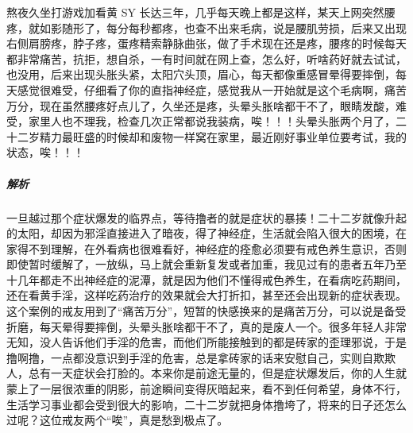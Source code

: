 \begin{case}[神经衰弱]
    熬夜久坐打游戏加看黄 SY 长达三年，几乎每天晚上都是这样，某天上网突然腰疼，就如影随形了，每分每秒都疼，也查不出来毛病，说是腰肌劳损，后来又出现右侧肩膀疼，脖子疼，蛋疼精索静脉曲张，做了手术现在还是疼，腰疼的时候每天都非常痛苦，抗拒，想自杀，一有时间就在网上查，怎么好，听啥药好就去试试，也没用，后来出现头胀头紧，太阳穴头顶，眉心，每天都像重感冒晕得要摔倒，每天感觉很难受，仔细看了你的直指神经症，感觉我从一开始就是这个毛病啊，痛苦万分，现在虽然腰疼好点儿了，久坐还是疼，头晕头胀啥都干不了，眼睛发酸，难受，家里人也不理我，检查几次正常都说我装病，唉！！！头晕头胀两个月了，二十二岁精力最旺盛的时候却和废物一样窝在家里，最近刚好事业单位要考试，我的状态，唉！！！
    \subparagraph{解析} 一旦越过那个症状爆发的临界点，等待撸者的就是症状的暴揍！二十二岁就像升起的太阳，却因为邪淫直接进入了暗夜，得了神经症，生活就会陷入很大的困境，在家得不到理解，在外看病也很难看好，神经症的痊愈必须要有戒色养生意识，否则即使暂时缓解了，一放纵，马上就会重新复发或者加重，我见过有的患者五年乃至十几年都走不出神经症的泥潭，就是因为他们不懂得戒色养生，在看病吃药期间，还在看黄手淫，这样吃药治疗的效果就会大打折扣，甚至还会出现新的症状表现。这个案例的戒友用到了“痛苦万分”，短暂的快感换来的是痛苦万分，可以说是备受折磨，每天晕得要摔倒，头晕头胀啥都干不了，真的是废人一个。很多年轻人非常无知，没人告诉他们手淫的危害，而他们所能接触到的都是砖家的歪理邪说，于是撸啊撸，一点都没意识到手淫的危害，总是拿砖家的话来安慰自己，实则自欺欺人，总有一天症状会打脸的。本来你是前途无量的，但是症状爆发后，你的人生就蒙上了一层很浓重的阴影，前途瞬间变得灰暗起来，看不到任何希望，身体不行，生活学习事业都会受到很大的影响，二十二岁就把身体撸垮了，将来的日子还怎么过呢？这位戒友两个“唉”，真是愁到极点了。
\end{case}

